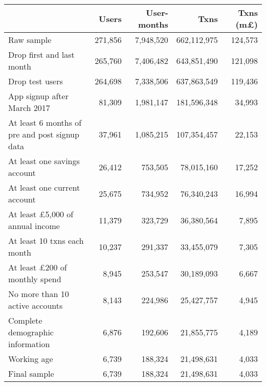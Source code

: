 \begin{tabular}{lrrrr}
\toprule
                                              &   Users & User-months &        Txns & Txns (m\pounds) \\
\midrule
                                   Raw sample & 271,856 &   7,948,520 & 662,112,975 &         124,573 \\
                    Drop first and last month & 265,760 &   7,406,482 & 643,851,490 &         121,098 \\
                              Drop test users & 264,698 &   7,338,506 & 637,863,549 &         119,436 \\
                  App signup after March 2017 &  81,309 &   1,981,147 & 181,596,348 &          34,993 \\
At least 6 months of pre and post signup data &  37,961 &   1,085,215 & 107,354,457 &          22,153 \\
                 At least one savings account &  26,412 &     753,505 &  78,015,160 &          17,252 \\
                 At least one current account &  25,675 &     734,952 &  76,340,243 &          16,994 \\
       At least \pounds5,000 of annual income &  11,379 &     323,729 &  36,380,564 &           7,895 \\
                  At least 10 txns each month &  10,237 &     291,337 &  33,455,079 &           7,305 \\
         At least \pounds200 of monthly spend &   8,945 &     253,547 &  30,189,093 &           6,667 \\
              No more than 10 active accounts &   8,143 &     224,986 &  25,427,757 &           4,945 \\
             Complete demographic information &   6,876 &     192,606 &  21,855,775 &           4,189 \\
                                  Working age &   6,739 &     188,324 &  21,498,631 &           4,033 \\
                                 Final sample &   6,739 &     188,324 &  21,498,631 &           4,033 \\
\bottomrule
\end{tabular}
